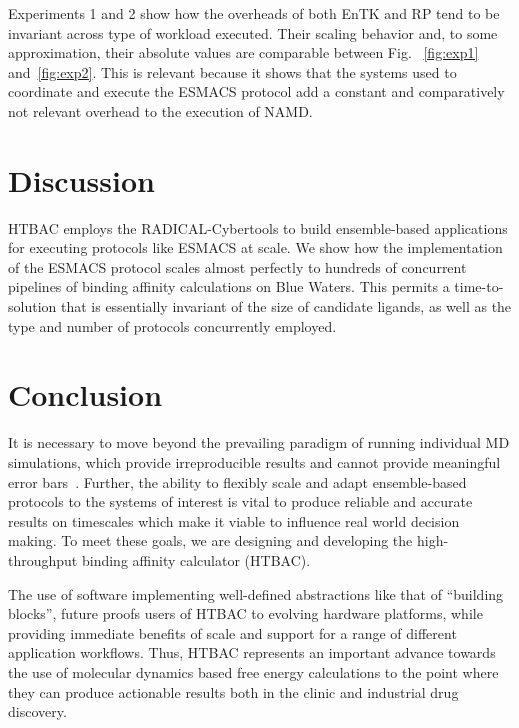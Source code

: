 \documentclass{bmcart}
\begin{document}
Experiments 1 and 2 show how the overheads of both EnTK and RP tend to be
invariant across type of workload executed. Their scaling behavior and, to
some approximation, their absolute values are comparable between
Fig. ~\ref{fig:exp1} and~\ref{fig:exp2}. This is relevant because it shows
that the systems used to coordinate and execute the ESMACS protocol add a
constant and comparatively not relevant overhead to the execution of NAMD\@.



\section*{Discussion}\label{sec:4}


HTBAC employs the RADICAL-Cybertools to build ensemble-based applications for
executing protocols like ESMACS at scale. We show how the implementation of
the ESMACS protocol scales almost perfectly to hundreds of concurrent
pipelines of binding affinity calculations on Blue Waters. 
This permits a time-to-solution that is essentially invariant of the size
of candidate ligands, as well as the type and number of protocols concurrently 
employed.


\section*{Conclusion}\label{sec:5}

It is necessary to move beyond the prevailing paradigm of running individual
MD simulations, which provide irreproducible results and cannot provide
meaningful error bars~\cite{Bhati2017}. Further, the ability to flexibly
scale and adapt ensemble-based protocols to the systems of interest is vital
to produce reliable and accurate results on timescales which make it viable
to influence real world decision making. To meet these goals, we are
designing and developing the high-throughput binding affinity calculator
(HTBAC).

The use of software implementing well-defined abstractions like that of
``building blocks'', future proofs users of HTBAC to evolving hardware
platforms, while providing immediate benefits of scale and support for a
range of different application workflows. Thus, HTBAC represents an important
advance towards the use of molecular dynamics based free energy calculations
to the point where they can produce actionable results both in the clinic and
industrial drug discovery.
\end{document}
